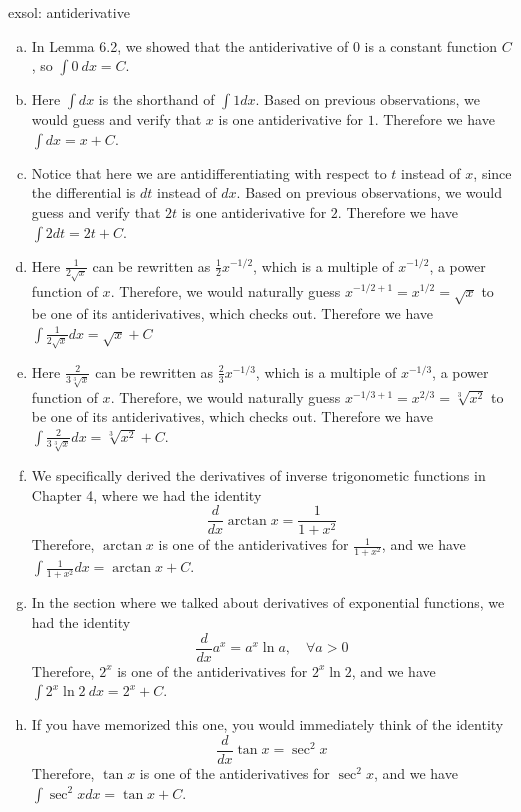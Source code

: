 \begin{exsol}[]{exsol: antiderivative}
    \begin{enumerate}[a)]
        \item In Lemma 6.2, we showed that the antiderivative of $0$ is a constant function $C$, so $\int 0~dx = C$.
        \item Here $\int dx$ is the shorthand of $\int 1 dx$.  Based on previous observations, we would guess and verify that $x$ is one antiderivative for $1$.  Therefore we have $\int dx = x + C$.
        \item Notice that here we are antidifferentiating with respect to $t$ instead of $x$, since the differential is $dt$ instead of $dx$.  Based on previous observations, we would guess and verify that $2t$ is one antiderivative for $2$.  Therefore we have $\int 2dt = 2t + C$.
        \item Here $\frac{1}{2\sqrt{x}}$ can be rewritten as $\frac{1}{2}x^{-1/2}$, which is a multiple of $x^{-1/2}$, a power function of $x$.  Therefore, we would naturally guess $x^{-1/2 + 1} = x^{1/2} = \sqrt{x}$ to be one of its antiderivatives, which checks out.  Therefore we have $\int \frac{1}{2\sqrt{x}} dx =  \sqrt{x} + C$
        \item Here $\frac{2}{3\sqrt[3]{x}}$ can be rewritten as $\frac{2}{3}x^{-1/3}$, which is a multiple of $x^{-1/3}$, a power function of $x$.  Therefore, we would naturally guess $x^{-1/3 + 1} = x^{2/3} = \sqrt[3]{x^2}$ to be one of its antiderivatives, which checks out.  Therefore we have $\int \frac{2}{3\sqrt[3]{x}} dx = \sqrt[3]{x^2} + C$.
        \item We specifically derived the derivatives of inverse trigonometic functions in Chapter 4, where we had the identity
        \[\frac{d}{dx}\arctan x = \frac{1}{1+x^2}\]
        Therefore, $\arctan x$ is one of the antiderivatives for $\frac{1}{1+x^2}$, and we have $\int \frac{1}{1+x^2} dx = \arctan x + C$.
        \item In the section where we talked about derivatives of exponential functions, we had the identity
        \[\frac{d}{dx} a^x = a^x \ln a, \quad \forall a > 0\]
        Therefore, $2^x$ is one of the antiderivatives for $2^x \ln 2$, and we have $\int 2^x \ln 2~dx = 2^x + C$.
        \item If you have memorized this one, you would immediately think of the identity
        \[\frac{d}{dx} \tan x = \sec^2 x\]
        Therefore, $\tan x$ is one of the antiderivatives for $\sec^2 x$, and we have $\int \sec^2 xdx = \tan x + C$.
    \end{enumerate}
\end{exsol}

